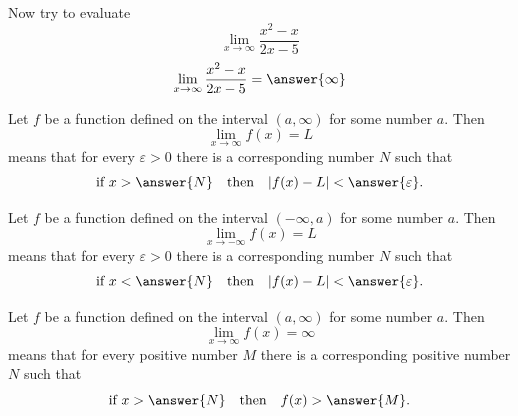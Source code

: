 \documentclass{ximera}
\begin{document}
\begin{exercise}\label{exercise:4-7}
Now try to evaluate
\[
\lim _{x \rightarrow \infty} \frac{x^{2}-x}{2 x-5}
\]
\[
\lim _{x \rightarrow \infty} \frac{x^{2}-x}{2 x-5} = \answer{\infty}
\]
\end{exercise}

\begin{definition}\label{definition:4-8}
Let $f$ be a function defined on the interval $(a, \infty)$ for some number $a$. Then
\[
\lim _{x \rightarrow \infty} f(x)=L
\]
means that for every $\varepsilon>0$ there is a corresponding number $N$ such that
\[
\text{if } x>\answer{N} \quad\text{then}\quad |f(x)-L|<\answer{\varepsilon}.
\]

Let $f$ be a function defined on the interval $(-\infty, a)$ for some number $a$. Then
\[
\lim _{x \rightarrow-\infty} f(x)=L
\]
means that for every $\varepsilon>0$ there is a corresponding number $N$ such that
\[
\text{if } x<\answer{N} \quad\text{then}\quad |f(x)-L|<\answer{\varepsilon}.
\]

Let $f$ be a function defined on the interval $(a, \infty)$ for some number $a$. Then
\[
\lim _{x \rightarrow \infty} f(x)=\infty
\]
means that for every positive number $M$ there is a corresponding positive number $N$ such that
\[
\text{if } x>\answer{N} \quad\text{then}\quad f(x)>\answer{M}.
\]
\end{definition}
\end{document}
